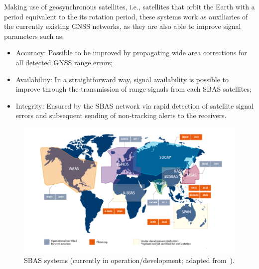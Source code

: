 Making use of geosynchronous satellites, i.e., satellites that orbit the Earth with a period equivalent to the its rotation period, these systems work as auxiliaries of the currently existing GNSS networks, as they are also able to improve signal parameters such as:
\begin{itemize}
    \item Accuracy: Possible to be improved by propagating wide area corrections for all detected GNSS range errors;
    \item Availability: In a straightforward way, signal availability is possible to improve through the transmission of range signals from each SBAS satellites;
    \item Integrity: Ensured by the SBAS network via rapid detection of satellite signal errors and subsequent sending of non-tracking alerts to the receivers. 
\end{itemize}

\begin{figure}[ht]
	\centering
	\includegraphics[width=1.0\textwidth]{Chapters/Figures/SBAS.png}
	\caption{SBAS systems (currently in operation/development; adapted from~\cite{sbas_euspa_2021}).}
	\label{fig:SBAS_systems}
\end{figure}

